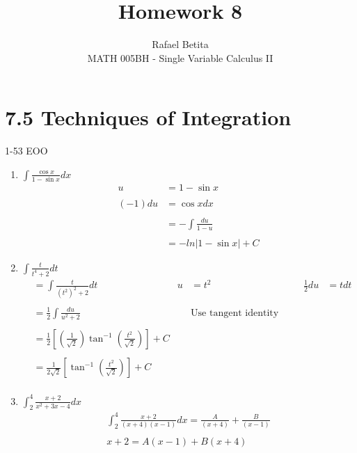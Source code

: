 \documentclass[12pt]{article}
\begin{document}
 
 
\title{Homework 8}
\author{Rafael Betita\\ 
MATH 005BH - Single Variable Calculus II}
 
\maketitle
 
\newpage
\section{7.5 Techniques of Integration} 1-53 EOO

\begin{enumerate}
  \item $\int\frac{\cos{x}}{1-\sin{x}}dx$
        \begin{align*}
            u &= 1-\sin{x}\\\\
            (-1)du &= \cos{x} dx\\\\
            &=-\int\frac{du}{1-u}\\\\
            &=-ln|1-\sin{x}|+C
        \end{align*}
    \addtocounter{enumi}{3}\item $\int \frac{t}{t^4+2}dt$
        \begin{align*}
            &= \int \frac{t}{(t^2)^2+2}dt & u &= t^2 & \frac{1}{2}du &= tdt\\\\
            &= \frac{1}{2}\int \frac{du}{u^2+2} && \text{Use tangent identity here}\\\\
            &= \frac{1}{2}\left[\left(\frac{1}{\sqrt{2}}\right)\tan^{-1}\left(\frac{t^2}{\sqrt{2}}\right)\right] +C\\\\
            &= \frac{1}{2\sqrt{2}}\left[\tan^{-1}\left(\frac{t^2}{\sqrt{2}}\right)\right] + C \\
        \end{align*}
    \addtocounter{enumi}{3}\item $\int_{2}^{4}\frac{x+2}{x^2+3x-4}dx$
        \begin{align*}
             \int_{2}^{4}\frac{x+2}{(x+4)(x-1)}dx = \frac{A}{(x+4)}+\frac{B}{(x-1)}\\\\
             x+2 = A(x-1) + B(x+4)\\

\end{align*}
\end{enumerate}
\end{document}

